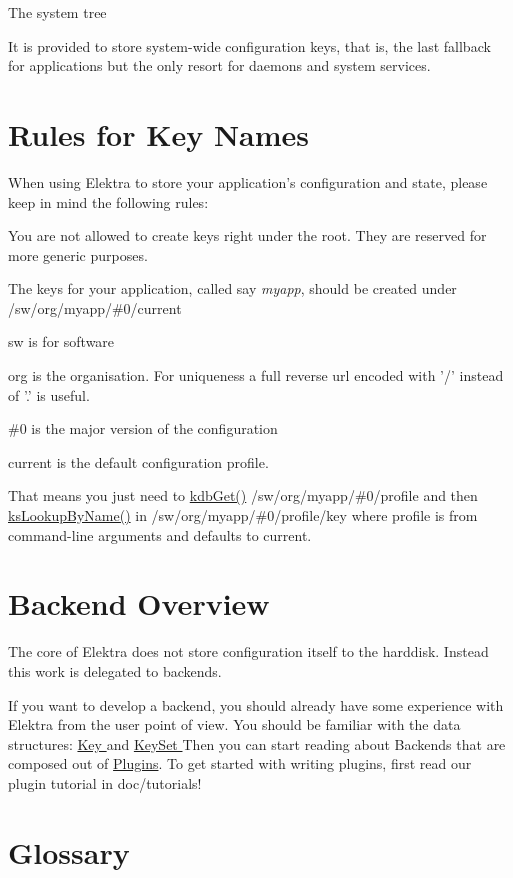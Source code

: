 \begin{DoxyItemize}
\item The {\ttfamily system} tree\par
 It is provided to store system-\/wide configuration keys, that is, the last fallback for applications but the only resort for daemons and system services.
\end{DoxyItemize}\hypertarget{index_rules}{}\section{Rules for Key Names}\label{index_rules}
When using Elektra to store your application's configuration and state, please keep in mind the following rules\-:
\begin{DoxyItemize}
\item You are not allowed to create keys right under the root. They are reserved for more generic purposes.
\item The keys for your application, called say {\itshape myapp}, should be created under {\ttfamily /sw/org/myapp/\#0/current} 
\begin{DoxyItemize}
\item sw is for software
\item org is the organisation. For uniqueness a full reverse url encoded with '/' instead of '.' is useful.
\item {\ttfamily \#0} is the major version of the configuration
\item current is the default configuration profile.
\item That means you just need to \hyperlink{group__kdb_ga28e385fd9cb7ccfe0b2f1ed2f62453a1}{kdb\-Get()} {\ttfamily /sw/org/myapp/\#0/profile} and then \hyperlink{group__keyset_gad2e30fb6d4739d917c5abb2ac2f9c1a1}{ks\-Lookup\-By\-Name()} in {\ttfamily /sw/org/myapp/\#0/profile/key} where profile is from command-\/line arguments and defaults to current.
\end{DoxyItemize}
\end{DoxyItemize}\hypertarget{index_backendsoverview}{}\section{Backend Overview}\label{index_backendsoverview}
The core of Elektra does not store configuration itself to the harddisk. Instead this work is delegated to backends.

If you want to develop a backend, you should already have some experience with Elektra from the user point of view. You should be familiar with the data structures\-: \hyperlink{group__key}{Key } and \hyperlink{group__keyset}{Key\-Set } Then you can start reading about Backends that are composed out of \hyperlink{group__plugin}{Plugins}. To get started with writing plugins, first read our plugin tutorial in doc/tutorials!\hypertarget{index_glossary}{}\section{Glossary}\label{index_glossary}

